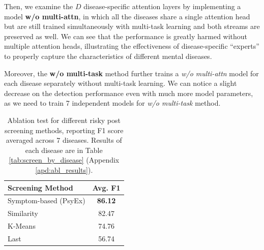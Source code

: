 Then, we examine the $D$ disease-specific attention layers by implementing a model \textbf{w/o multi-attn}, in which all the diseases share a single attention head but are still trained simultaneously with multi-task learning and both streams are preserved as well. We can see that the performance is greatly harmed without multiple attention heads, illustrating the effectiveness of disease-specific ``experts'' to properly capture the characteristics of different mental diseases.

Moreover, the \textbf{w/o multi-task} method further trains a \textit{w/o multi-attn} model for each disease separately without multi-task learning. We can notice a slight decrease on the detection performance even with much more model parameters, as we need to train 7 independent models for \textit{w/o multi-task} method. 
\begin{table}[th]
    \small
    \centering
    \begin{tabular}{l|c}
        \hline
        Screening Method & Avg. F1             \\
        \hline
        Symptom-based (PsyEx) &  \textbf{86.12}      \\
        Similarity \cite{zhang2022psychiatric} & 82.47 \\
        K-Means \cite{zogan2021depressionnet} & 74.76\\
        Last & 56.74    \\
        \hline
    \end{tabular}
    \caption{Ablation test for different risky post screening methods, reporting F1 score averaged across 7 diseases. Results of each disease are in Table \ref{tab:screen_by_disease} (Appendix \ref{apd:abl_results}).}
    \label{tab:ablation_screen}
\end{table}

